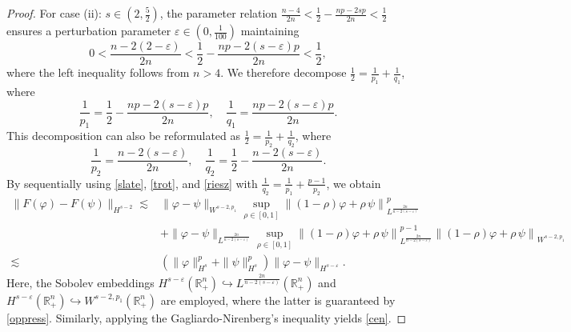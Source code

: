 \documentclass[preprint,compress,12pt]{elsarticle}
\numberwithin{equation}{section}
\begin{document}
\begin{proof}
	
	For case (ii): $s\in \left(2,\frac{5}{2}\right)$, the parameter relation $\frac{n-4}{2n}<\frac{1}{2}-\frac{np-2s p}{2n}<\frac{1}{2}$
	ensures a perturbation parameter $\varepsilon\in\left(0,\frac{1}{100}\right)$ maintaining
	\begin{equation}\label{oppress} 0<\frac{n-2(2-\varepsilon)}{2n}<\frac{1}{2}-\frac{np-2(s-\varepsilon)p}{2n}<\frac{1}{2},
	\end{equation}
	where the left inequality follows from $n>4$.
	We therefore decompose $\frac{1}{2}=\frac{1}{p_{1}}+\frac{1}{q_{1}}$, where
	\begin{equation*}			\frac{1}{p_{1}}=\frac{1}{2}-\frac{np-2(s-\varepsilon)p}{2n},\quad\frac{1}{q_{1}}=\frac{np-2(s-\varepsilon)p}{2n}.
	\end{equation*}
	This decomposition can also be reformulated as $\frac{1}{2}=\frac{1}{p_{2}}+\frac{1}{q_{2}}$, where
	\begin{equation*} \frac{1}{p_{2}}=\frac{n-2(s-\varepsilon)}{2n},\quad\frac{1}{q_{2}}=\frac{1}{2}-\frac{n-2(s-\varepsilon)}{2n}.
	\end{equation*}
	By sequentially using \eqref{slate}, \eqref{trot}, and \eqref{riesz} with $\frac{1}{q_{2}}
	=\frac{1}{p_{1}}+\frac{p-1}{p_{2}}$, we obtain
	{\small	\begin{equation*}
			\begin{aligned}
				\|F(\varphi)-F(\psi)\|_{H^{s-2}}
				\lesssim&\|\varphi-\psi\|_{W^{s-2,p_{1}}}
				\sup_{\rho\in[0,1]} \left\|(1-\rho)\varphi+\rho\,\psi\right\|_{L^{\frac{2n}{n-2(s-\varepsilon)}}} ^{p}    \\
				&+ \|\varphi-\psi\|_{L^{\frac{2n}{n-2(s-\varepsilon)}}} \sup_{\rho\in[0,1]} \left\|(1-\rho)\varphi+\rho\,\psi\right\|_{L^{\frac{2n}{n-2(s-\varepsilon)}}}^{p-1} \left\|(1-\rho)\varphi+\rho\,\psi\right\|_{W^{s-2,p_{1}}} \\					\lesssim&\left(\|\varphi\|_{H^{s}}^{p}+\|\psi\|_{H^{s}}^{p}\right) \|\varphi-\psi\|_{H^{s-\varepsilon}}.
			\end{aligned}
	\end{equation*}}
	Here, the Sobolev embeddings $H^{s-\varepsilon}(\mathbb{R}_{+}^{n})\hookrightarrow L^{\frac{2n}{n-2(s-\varepsilon)}}(\mathbb{R}_{+}^{n})$ and $H^{s-\varepsilon}(\mathbb{R}_{+}^{n})\hookrightarrow W^{s-2,p_{1}}(\mathbb{R}_{+}^{n})$ are employed, where the latter is guaranteed by \eqref{oppress}.
	Similarly, applying the Gagliardo-Nirenberg's inequality yields \eqref{cen}.
\end{proof}
\end{document}
